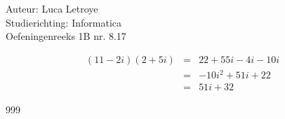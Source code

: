 \documentclass[a4paper]{article}
\begin{document}
  
\noindent \large Auteur: Luca Letroye \\
\noindent \large Studierichting: Informatica\\
\noindent \large Oefeningenreeks 1B nr. 8.17\\

\medskip

\normalsize
\begin{eqnarray*}
(11-2i)(2+5i) &=& 22 + 55i -4i - 10i\\
&=& -10i^2 + 51i + 22\\
&=& 51i + 32
\end{eqnarray*}


\begin{thebibliography}{999}
\end{thebibliography}
\end{document}
